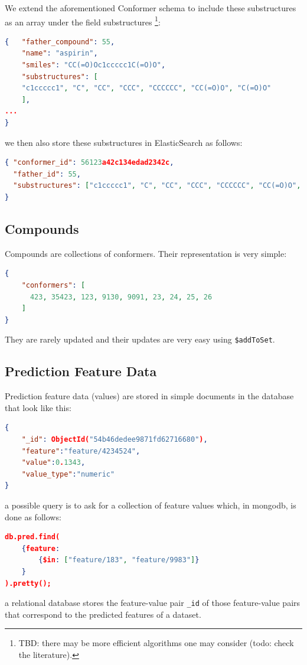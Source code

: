 We extend the aforementioned Conformer schema to include 
these substructures as an array under the field substructures%
\footnote{TBD: there may be more efficient algorithms one may consider (todo: check the literature).}:
\begin{lstlisting}[language=json]
{   "father_compound": 55, 
    "name": "aspirin", 
    "smiles": "CC(=O)Oc1ccccc1C(=O)O",
    "substructures": [ 
	"c1ccccc1", "C", "CC", "CCC", "CCCCCC", "CC(=O)O", "C(=O)O" 
    ],
...
}
\end{lstlisting}
%
we then also store these substructures in ElasticSearch as follows:
\begin{lstlisting}[language=json]
{ "conformer_id": 56123a42c134edad2342c, 
  "father_id": 55,
  "substructures": ["c1ccccc1", "C", "CC", "CCC", "CCCCCC", "CC(=O)O", "C(=O)O"]
}
\end{lstlisting}

\subsection{Compounds}
Compounds are collections of conformers. Their representation is very simple:
\begin{lstlisting}[language=json]
{ 
    "conformers": [   
      423, 35423, 123, 9130, 9091, 23, 24, 25, 26 
    ]
}
\end{lstlisting}
%
They are rarely updated and their updates are very easy using \texttt{\$addToSet}.

\subsection{Prediction Feature Data}
Prediction feature data (values) are stored in simple 
documents in the database that look like this:

\begin{lstlisting}[language=json]
{ 
    "_id": ObjectId("54b46dedee9871fd62716680"),
    "feature":"feature/4234524", 
    "value":0.1343,
    "value_type":"numeric"
} 
\end{lstlisting}
%
a possible query is to ask for a collection of feature 
values which, in mongodb, is done as follows:
\begin{lstlisting}[language=json]
db.pred.find( 
    {feature:  
        {$in: ["feature/183", "feature/9983"]} 
    } 
).pretty(); 
\end{lstlisting}
%
a relational database stores the feature-value pair \texttt{\_id} of those 
feature-value pairs that correspond to the predicted features of a dataset. 

